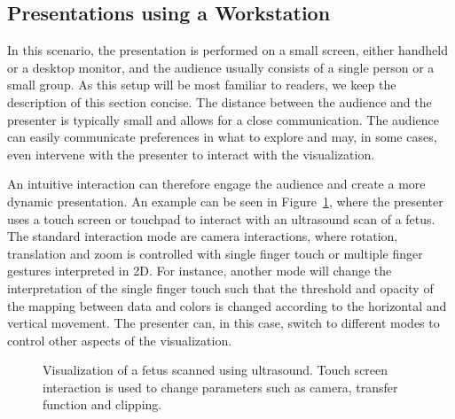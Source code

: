 \documentclass[review,journal]{vgtc}         %
\begin{document}
%
%
\subsection{Presentations using a Workstation} \label{sec:workstation}
In this scenario, the presentation is performed on a small screen, either handheld or a desktop monitor, and the audience usually consists of a single person or a small group.
As this setup will be most familiar to readers, we keep the description of this section concise.
The distance between the audience and the presenter is typically small and allows for a close communication.
The audience can easily communicate preferences in what to explore and may, in some cases, even intervene with the presenter to interact with the visualization.

An intuitive interaction can therefore engage the audience and create a more dynamic presentation.
An example can be seen in Figure~\ref{img:touch_workstation}, where the presenter uses a touch screen or touchpad to interact with an ultrasound scan of a fetus.
The standard interaction mode are camera interactions, where rotation, translation and zoom is controlled with single finger touch or multiple finger gestures interpreted in 2D.
For instance, another mode will change the interpretation of the single finger touch such that the threshold and opacity of the mapping between data and colors is changed according to the horizontal and vertical movement. 
The presenter can, in this case, switch to different modes to control other aspects of the visualization.

%
%
%
%

\begin{figure}
	\centering
	\caption{Visualization of a fetus scanned using ultrasound. Touch screen interaction is used to change parameters such as camera, transfer function and clipping.}
	\label{img:touch_workstation}
\end{figure}
\end{document}
